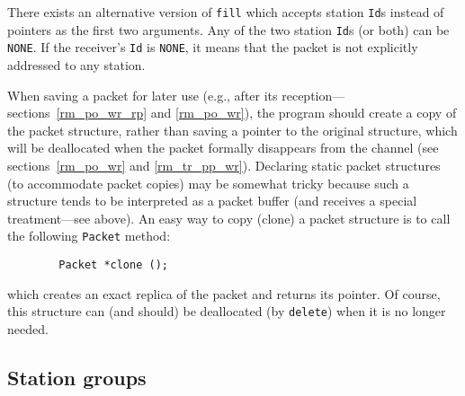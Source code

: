 There exists an alternative version of {\tt fill} which accepts station
{\tt Id}s instead of pointers as the first two arguments.
Any of the two station {\tt Id}s (or both) can be {\tt NONE}.
If the receiver's {\tt Id} is {\tt NONE},
it means that the packet is not explicitly addressed to any station.

When saving a packet for later use (e.g.,
after its reception---sections~\ref{rm_po_wr_rp} and \ref{rm_po_wr}),
the program should create a copy of the packet structure, rather than
saving a pointer to the original structure, which will be deallocated
when the packet formally disappears from the channel (see
sections~\ref{rm_po_wr} and \ref{rm_tr_pp_wr}).
Declaring static packet structures (to accommodate packet copies) may be
somewhat tricky because such a structure tends to be interpreted as a packet
buffer (and receives a special treatment---see above).
An easy way to copy (clone) a packet structure is to call the following
{\tt Packet} method:
\begin{verbatim}
        Packet *clone ();
\end{verbatim}
which creates an exact replica of the packet and returns its
pointer.
Of course, this structure can (and
should) be deallocated (by {\tt delete}) when it is no longer needed.

\subsection{Station groups}
\label{rm_cl_sg}

